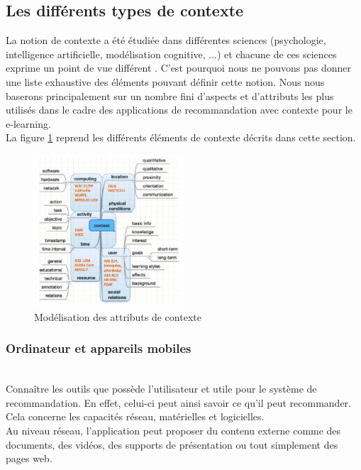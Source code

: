 \documentclass[conference]{./sty/IEEEtran}
\begin{document}
\subsection{Les différents types de contexte}

La notion de contexte a été étudiée dans différentes sciences (psychologie,
intelligence artificielle, modélisation cognitive, ...) et chacune de ces
sciences exprime un point de vue différent
\cite{DBLP:reference/rsh/AdomaviciusT11}. C'est pourquoi nous ne pouvons pas
donner une liste exhaustive des éléments pouvant définir cette notion. Nous
nous baserons principalement sur un nombre fini d'aspects et d'attributs les
plus utilisés dans le cadre des applications de recommandation avec contexte
pour le e-learning. \\

La figure \ref{fig:context} reprend les différents éléments de contexte décrits dans cette section. \\

\begin{figure}[tb]
  \centering
  \caption{\label{fig:context} Modélisation des attributs de contexte \cite{DBLP:journals/tlt/VerbertMOWDBD12}}
  \includegraphics[width=0.5\textwidth]{context}
\end{figure}

\subsubsection{Ordinateur et appareils mobiles}
~\\
Connaître les outils que possède l'utilisateur et utile pour le système de
recommandation. En effet, celui-ci peut ainsi savoir ce qu'il peut recommander.
Cela concerne les capacités réseau, matérielles et logicielles. \\

Au niveau réseau, l'application peut proposer du contenu externe comme des
documents, des vidéos, des supports de présentation ou tout simplement des
pages web. \\
\end{document}
